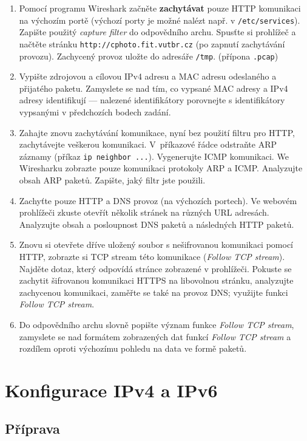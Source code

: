 \begin{enumerate}
  \item Pomocí programu Wireshark začněte \textbf{zachytávat} pouze HTTP komunikaci na výchozím portě
    (výchozí porty je možné nalézt např. v \texttt{/etc/services}). Zapište
    použitý \emph{capture filter} do odpovědního archu. Spusťte si prohlížeč a
    načtěte stránku \texttt{http://cphoto.fit.vutbr.cz} (po zapnutí zachytávání
    provozu). Zachycený provoz uložte do adresáře \texttt{/tmp}. (přípona \texttt{.pcap})
\item Vypište zdrojovou a cílovou IPv4 adresu a MAC adresu odeslaného a
  přijatého paketu. Zamyslete se nad tím, co vypsané MAC adresy a IPv4 adresy
    identifikují --- nalezené identifikátory porovnejte s identifikátory
    vypsanými v předchozích bodech zadání.
\item Zahajte znovu zachytávání komunikace, nyní bez použití filtru pro HTTP,
  zachytávejte veškerou komunikaci. V~příkazové řádce odstraňte ARP záznamy
    (příkaz \texttt{ip neighbor ...}). Vygenerujte ICMP komunikaci. We
    Wiresharku zobrazte pouze komunikaci
    protokoly ARP a ICMP. Analyzujte obsah ARP paketů. Zapište, jaký filtr jste
    použili.
\item Zachyťte pouze HTTP a DNS provoz (na výchozích portech). Ve webovém prohlížeči zkuste otevřít několik stránek na různých URL adresách. Analyzujte obsah a posloupnost DNS paketů a následných HTTP paketů.
\item Znovu si otevřete dříve uložený soubor s nešifrovanou komunikaci pomocí
  HTTP, zobrazte si TCP stream této komunikace (\emph{Follow TCP stream}).
    Najděte dotaz, který odpovídá stránce zobrazené v prohlížeči. Pokuste se
    zachytit šifrovanou komunikaci HTTPS na libovolnou stránku, analyzujte
    zachycenou komunikaci, zaměřte se také na provoz DNS; využijte funkci \emph{Follow TCP stream}.
\item Do odpovědního archu slovně popište význam funkce \emph{Follow TCP stream},
    zamyslete se nad formátem zobrazených dat funkcí \emph{Follow TCP stream} a
    rozdílem oproti výchozímu pohledu na data ve formě paketů.
\end{enumerate}

\section{Konfigurace IPv4 a IPv6}

\subsection{Příprava}

